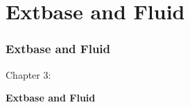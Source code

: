 %

\section{Extbase and Fluid}
\begin{frame}[fragile]
	\frametitle{Extbase and Fluid}

	\begin{center}\huge{Chapter 3:}\end{center}
	\begin{center}\huge{\color{typo3darkgrey}\textbf{Extbase and Fluid}}\end{center}

\end{frame}

